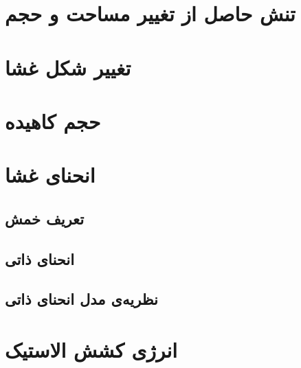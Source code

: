 \setRL
\clearpage

\def \MemTB {\Mempath /MembraneTheoreticalBackground}


%
\section{
تنش حاصل از تغییر مساحت و حجم
}

\section{
تغییر شکل غشا
}

\section{
حجم کاهیده
}



\section{
انحنای غشا
}
\subsection{
تعریف خمش
}


\subsection{
انحنای ذاتی
}


\subsection{
نظریه‌ی مدل انحنای ذاتی
\label{sec:spontaneousCurvatureModel}
}



\section{
انرژی کشش الاستیک
}











